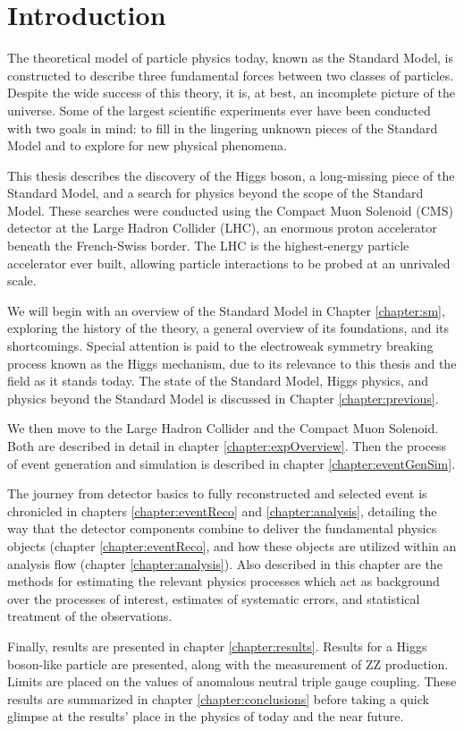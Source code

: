 \chapter{Introduction}
\label{chapter:introduction}

The theoretical model of particle physics today, known as the Standard Model, is
constructed to describe three fundamental forces between two classes of
particles. Despite the wide success of this theory, it is, at best, an
incomplete picture of the universe. Some of the largest scientific experiments
ever have been conducted with two goals in mind: to fill in the lingering
unknown pieces of the Standard Model and to explore for new physical phenomena.

This thesis describes the discovery of the Higgs boson, a long-missing
piece of the Standard Model, and a search for physics beyond the scope of the
Standard Model.  These searches were conducted using the Compact Muon Solenoid
(CMS) detector at the Large Hadron Collider (LHC), an enormous proton
accelerator beneath the French-Swiss border. The LHC is the highest-energy
particle accelerator ever built, allowing particle interactions to be probed at
an unrivaled scale.

We will begin with an overview of the Standard Model in Chapter
\ref{chapter:sm}, exploring the history of the theory, a general overview of
its foundations, and its shortcomings. Special attention is paid to the
electroweak symmetry breaking process known as the Higgs mechanism, due to its
relevance to this thesis and the field as it stands today. The state of the
Standard Model, Higgs physics, and physics beyond the Standard Model is
discussed in Chapter \ref{chapter:previous}.

We then move to the Large Hadron Collider and the Compact Muon Solenoid. Both
are described in detail in chapter \ref{chapter:expOverview}.  Then the process
of event generation and simulation is described in chapter
\ref{chapter:eventGenSim}.

The journey from detector basics to fully reconstructed and selected event is
chronicled in chapters \ref{chapter:eventReco} and \ref{chapter:analysis},
detailing the way that the detector components combine to deliver the
fundamental physics objects (chapter \ref{chapter:eventReco}, and how these
objects are utilized within an analysis flow (chapter \ref{chapter:analysis}).
Also described in this chapter are the methods for estimating the relevant
physics processes which act as background over the processes of interest,
estimates of systematic errors, and statistical treatment of the observations.

Finally, results are presented in chapter \ref{chapter:results}. Results for a
Higgs boson-like particle are presented, along with the measurement of ZZ
production. Limits are placed on the values of anomalous neutral triple gauge
coupling. These results are summarized in chapter \ref{chapter:conclusions}
before taking a quick glimpse at the results' place in the physics of today and
the near future.
